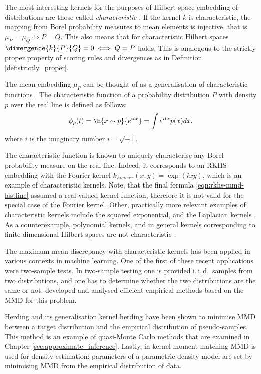 The most interesting kernels for the purposes of Hilbert-space embedding of distributions are those called \emph{characteristic} \citep{Sriperumbudur2008}. If the kernel $k$ is characteristic, the mapping from Borel probability measures to mean elements is injective, that is $\mu_P = \mu_Q \iff P = Q$. This also means that for characteristic Hilbert spaces $\divergence{k}{P}{Q} = 0 \iff Q=P$ holds. This is analogous to the strictly proper property of scoring rules and divergences as in Definition \ref{def:strictly_proper}.

The mean embedding $\mu_P$ can be thought of as a generalisation of characteristic functions \citep[see \eg][]{Ord1999}. The characteristic function of a probability distribution $P$ with density $p$ over the real line is defined as follows:
%
\begin{equation}
	\phi_p(t) = \E{x\sim p}{e^{ i t x}} = \int e^{i t x} p(x) dx,
\end{equation}
%
where $i$ is the imaginary number $i=\sqrt{-1}$.

The characteristic function is known to uniquely characterise any Borel probability measure on the real line. Indeed, it corresponds to an RKHS-embedding with the Fourier kernel $k_{Fourier}(x,y) = \exp(ixy)$, which is an example of characteristic kernels. Note, that the final formula \eqref{eqn:rkhs-mmd-lastline} assumed a real valued kernel function, therefore it is not valid for the special case of the Fourier kernel. Other, practically more relevant examples of characteristic kernels include the squared exponential, and the Laplacian kernels \citep[see \eg][]{Rasmussen2006}. As a counterexample, polynomial kernels, and in general kernels corresponding to finite dimensional Hilbert spaces are not characteristic \citep{Sriperumbudur2008}.

The maximum mean discrepancy with characteristic kernels has been applied in various contexts in machine learning. One of the first of these recent applications were two-sample tests. In two-sample testing one is provided i.\,i.\,d.\ samples from two distributions, and one has to determine whether the two distributions are the same or not. \citet{Gretton2012} developed and analysed efficient empirical methods based on the MMD for this problem.

Herding \citep{welling2009herding} and its generalisation kernel herding \citep{Chen2010} have been shown to minimise MMD between a target distribution and the empirical distribution of pseudo-samples. This method is an example of quasi-Monte Carlo methods that are examined in Chapter \ref{sec:approximate_inference}. Lastly, in kernel moment matching \citep{Song2008} MMD is used for density estimation: parameters of a parametric density model are set by minimising MMD from the empirical distribution of data.

